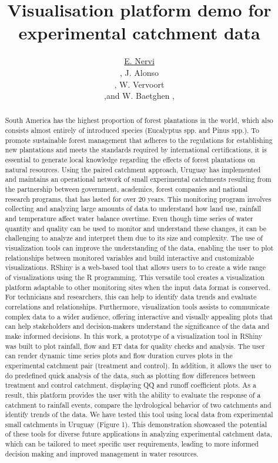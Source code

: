 \documentclass[a4paper,fleqn]{article} %
\title{Visualisation platform demo for experimental catchment data
 } %
\author{\underline{E. Nervi} %
 \address[A1]{\it{Instituto Nacional de Investigación Agropecuaria (INIA), FPTA 358,  Montevideo, Uruguay }} \orcid{0000-0000-0000-0000}, J. Alonso \address[B1]{\it{IMFIA, School of Engineering, Universidad de la República, Montevideo, Uruguay}}, W. Vervoort \address[C1]{\it{The University of Sydney, Sydney, Australia}},and W. Baetghen \addressmark[D1],\address[D1]{\it{IRI, The Earth Institute, Columbia University, New York, United States}}
}
\begin{document}
\begin{abstract}

South America has the highest proportion of forest plantations in the world, which also consists almost entirely of introduced species (Eucalyptus spp. and Pinus spp.). To promote sustainable forest management that adheres to the regulations for establishing new plantations and meets the standards required by international certifications, it is essential to generate local knowledge regarding the effects of forest plantations on natural resources. Using the paired catchment approach, Uruguay has implemented and maintains an operational network of small experimental catchments resulting from the partnership between government, academics, forest companies and national research programs, that has lasted for over 20 years. This monitoring program involves collecting and analyzing large amounts of data to understand how land use, rainfall and temperature affect water balance overtime. Even though time series of water quantity and quality can be used to monitor and understand these changes, it can be challenging to analyze and interpret them due to its size and complexity. The use of visualization tools can improve the understanding of the data, enabling the user to plot relationships between monitored variables and build interactive and customizable visualizations. RShiny is a web-based tool that allows users to to create a wide range of visualizations using the R programming. This versatile tool creates a visualization platform adaptable to other monitoring sites when the input data format is conserved. For technicians and researchers, this can help to identify data trends and evaluate correlations and relationships. Furthermore, visualization tools assists to communicate complex data to a wider audience, offering interactive and visually appealing plots that can help stakeholders and decision-makers understand the significance of the data and make informed decisions. In this work, a prototype of a visualization tool in RShiny was built to plot rainfall, flow and ET data for quality checks and analysis. The user can render dynamic time series plots and flow duration curves plots in the experimental catchment pair (treatment and control). In addition, it allows the user to do predefined quick analysis of the data, such as plotting flow differences between treatment and control catchment, displaying QQ and runoff coefficient plots. As a result, this platform provides the user with the ability to evaluate the response of a catchment to rainfall events, compare the hydrological behavior of two catchments and identify trends of the data.  We have tested this tool using local data from experimental small catchments in Uruguay (Figure 1). This demonstration showcased the potential of these tools for diverse future applications in analyzing experimental catchment data, which can be tailored to meet specific user requirements, leading to more informed decision making and improved management in water resources. 
\end{abstract}
\end{document}
